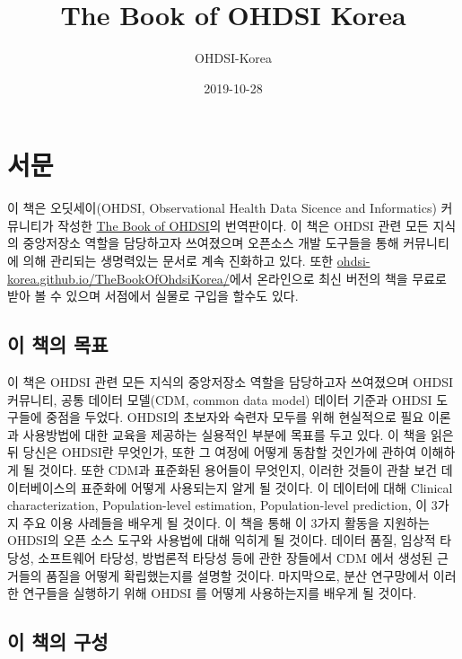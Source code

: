 \documentclass[11pt]{book}
\title{The Book of OHDSI Korea}
\author{OHDSI-Korea}
\date{2019-10-28}
\theoremstyle{definition}
\theoremstyle{definition}
\theoremstyle{definition}
\theoremstyle{remark}
\begin{document}
\maketitle

{
\setcounter{tocdepth}{1}
\tableofcontents
}
\chapter*{서문}

 이 책은 오딧세이(OHDSI, Observational Health Data Sicence and
Informatics) 커뮤니티가 작성한 \href{book.ohdsi.org}{The Book of
OHDSI}의 번역판이다. 이 책은 OHDSI 관련 모든 지식의 중앙저장소 역할을
담당하고자 쓰여졌으며 오픈소스 개발 도구들을 통해 커뮤니티에 의해
관리되는 생명력있는 문서로 계속 진화하고 있다. 또한
\href{https://ohdsi-korea.github.io/TheBookOfOhdsiKorea/}{ohdsi-korea.github.io/TheBookOfOhdsiKorea/}에서
온라인으로 최신 버전의 책을 무료로 받아 볼 수 있으며 서점에서 실물로
구입을 할수도 있다.

\section*{이 책의 목표}\label{--}

이 책은 OHDSI 관련 모든 지식의 중앙저장소 역할을 담당하고자 쓰여졌으며
OHDSI 커뮤니티, 공통 데이터 모델(CDM, common data model) 데이터 기준과
OHDSI 도구들에 중점을 두었다. OHDSI의 초보자와 숙련자 모두를 위해
현실적으로 필요 이론과 사용방법에 대한 교육을 제공하는 실용적인 부분에
목표를 두고 있다. 이 책을 읽은 뒤 당신은 OHDSI란 무엇인가, 또한 그
여정에 어떻게 동참할 것인가에 관하여 이해하게 될 것이다. 또한 CDM과
표준화된 용어들이 무엇인지, 이러한 것들이 관찰 보건 데이터베이스의
표준화에 어떻게 사용되는지 알게 될 것이다. 이 데이터에 대해 Clinical
characterization, Population-level estimation, Population-level
prediction, 이 3가지 주요 이용 사례들을 배우게 될 것이다. 이 책을 통해
이 3가지 활동을 지원하는 OHDSI의 오픈 소스 도구와 사용법에 대해 익히게
될 것이다. 데이터 품질, 임상적 타당성, 소프트웨어 타당성, 방법론적
타당성 등에 관한 장들에서 CDM 에서 생성된 근거들의 품질을 어떻게
확립했는지를 설명할 것이다. 마지막으로, 분산 연구망에서 이러한 연구들을
실행하기 위해 OHDSI 를 어떻게 사용하는지를 배우게 될 것이다.

\section*{이 책의 구성}\label{--}
\end{document}
